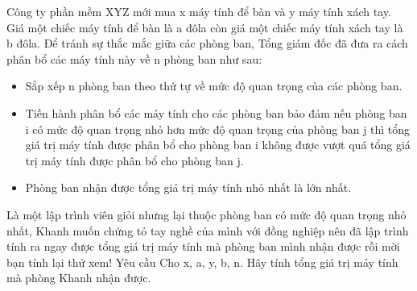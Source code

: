 Công ty phần mềm XYZ mới mua x máy tính để bàn và y máy tính xách tay. Giá một chiếc máy tính để bàn là a đôla còn giá một chiếc máy tính xách tay là b đôla. Để tránh sự thắc mắc giữa các phòng ban, Tổng giám đốc đã đưa ra cách phân bổ các máy tính này về n phòng ban như sau:  
\begin{itemize}
	\item     Sắp xếp n phòng ban theo thứ tự về mức độ quan trọng của các phòng ban.   
	\item     Tiến hành phân bổ các máy tính cho các phòng ban bảo đảm nếu phòng ban i có mức độ quan trọng nhỏ hơn mức độ quan trọng của phòng ban j thì tổng giá trị máy tính được phân bổ cho phòng ban i không được vượt quá tổng giá trị máy tính được phân bổ cho phòng ban j.   
	\item     Phòng ban nhận được tổng giá trị máy tính nhỏ nhất là lớn nhất.   
\end{itemize}

   Là một lập trình viên giỏi nhưng lại thuộc phòng ban có mức độ quan trọng nhỏ nhất, Khanh muốn chứng tỏ tay nghề của mình với đồng nghiệp nên đã lập trình tính ra ngay được tổng giá trị máy tính mà phòng ban mình nhận được rồi mời bạn tính lại thử xem!
   Yêu cầu  
Cho x, a, y, b, n. Hãy tính tổng giá trị máy tính mà phòng Khanh nhận được.